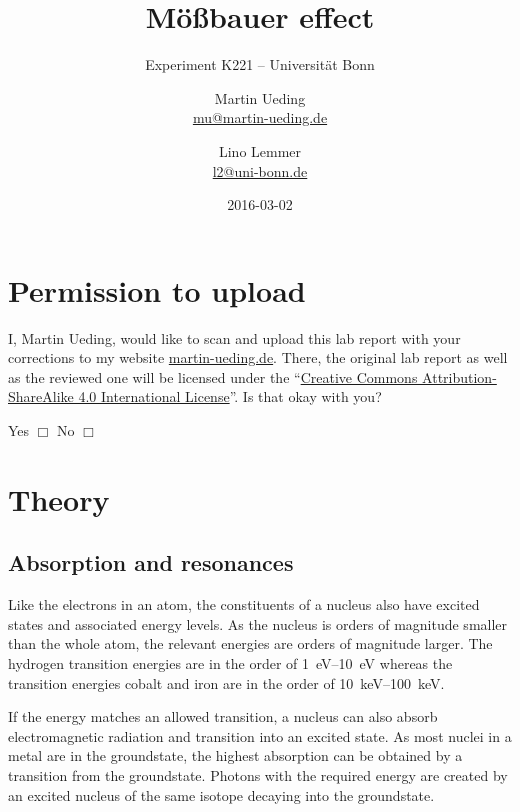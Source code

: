 \documentclass[11pt, english, fleqn, DIV=15, headinclude, BCOR=2cm]{scrreprt}
\title{Mößbauer effect}
\subtitle{Experiment K221 -- Universität Bonn}
\author{%
    Martin Ueding \\
    \small{\href{mailto:mu@martin-ueding.de}{mu@martin-ueding.de}}
    \and
    Lino Lemmer \\
    \small{\href{mailto:l2@uni-bonn.de}{l2@uni-bonn.de}}
}
\date{2016-03-02}
\begin{document}
\maketitle

\begin{abstract}
\end{abstract}

\tableofcontents

\chapter*{Permission to upload}

I, Martin Ueding, would like to scan and upload this lab report with your
corrections to my website \href{http://martin-ueding.de}{martin-ueding.de}.
There, the original lab report as well as the reviewed one will be licensed
under the “\href{http://creativecommons.org/licenses/by-sa/4.0/}{Creative
Commons Attribution-ShareAlike 4.0 International License}”. Is that okay with
you?

Yes $\Box$ \hspace{2cm} No $\Box$

\chapter{Theory}




\section{Absorption and resonances}

Like the electrons in an atom, the constituents of a nucleus also have
excited states and associated energy levels. As the nucleus is orders of
magnitude smaller than the whole atom, the relevant energies are orders of
magnitude larger. The hydrogen transition energies are in the order of
\SIrange{1}{10}{\electronvolt} whereas the transition energies cobalt and iron
are in the order of \SIrange{10}{100}{\kilo\electronvolt}.

If the energy matches an allowed transition, a nucleus can also absorb
electromagnetic radiation and transition into an excited state. As most nuclei
in a metal are in the groundstate, the highest absorption can be obtained by a
transition from the groundstate. Photons with the required energy are created
by an excited nucleus of the same isotope decaying into the groundstate.
\end{document}
